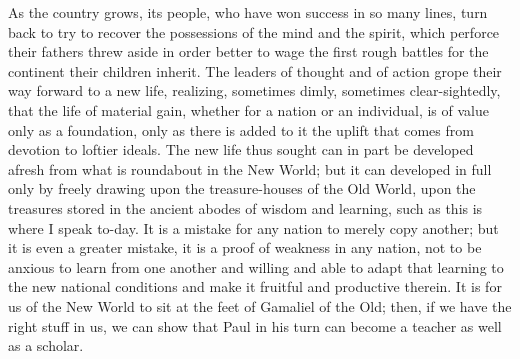 \documentclass{scrbook}
\begin{document}
As the country grows, its people, who have won success in so many lines, turn back
to try to recover the possessions of the mind and the spirit, which perforce their fathers
threw aside in order better to wage the first rough battles for the continent their children
inherit. The leaders of thought and of action grope their way forward to a new life, realizing,
sometimes dimly, sometimes clear-sightedly, that the life of material gain, whether for a
nation or an individual, is of value only as a foundation, only as there is added to it the
uplift that comes from devotion to loftier ideals. The new life thus sought can in part be
developed afresh from what is roundabout in the New World; but it can developed in full
only by freely drawing upon the treasure-houses of the Old World, upon the treasures stored
in the ancient abodes of wisdom and learning, such as this is where I speak to-day. It is a
mistake for any nation to merely copy another; but it is even a greater mistake, it is a proof
of weakness in any nation, not to be anxious to learn from one another and willing and able
to adapt that learning to the new national conditions and make it fruitful and productive
therein. It is for us of the New World to sit at the feet of Gamaliel of the Old; then, if we
have the right stuff in us, we can show that Paul in his turn can become a teacher as well as
a scholar.
\end{document}
